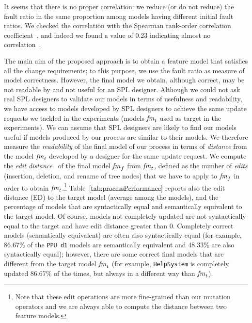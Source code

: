 \begin{tikzborder}{\cite{Gargantini16:validation}}
\begin{tikzborder}{\cite{gargantini_combinatorial_2017}}
\begin{tikzborder}{\cite{gargantini_combinatorial_2017}}
\begin{tikzborder}{\cite{garn2019}}
\begin{tikzborder}{\cite{arcaini2019achieving}}
	\bb It seems that there is no proper correlation: we reduce (or do not reduce) the fault ratio in the same proportion among models having different initial fault ratios. We checked the correlation with the Spearman rank-order correlation coefficient~\cite{Wohlin2012}, and indeed we found a value of 0.23 indicating almost no correlation~\cite{hinkle2003applied}.
	
	
	The main aim of the proposed approach is to obtain a feature model that satisfies all the change requirements; to this purpose, we use the fault ratio as measure of model correctness. However, the final model we obtain, although correct, may be not readable by and not useful for an SPL designer. Although we could not ask real SPL designers to validate our models in terms of usefulness and readability, we have access to models developed by SPL designers to achieve the same update requests we tackled in the experiments (models $\mathit{fm}_t$ used as target in the experiments). We can assume that SPL designers are likely to find our models useful if models produced by our process are similar to their models. We therefore measure the {\it readability} of the final model of our process in terms of {\it distance} from the model $\mathit{fm}_t$ developed by a designer for the same update request. We compute the {\it edit distance}~\cite{pawlik_efficient_2015,pawlik_tree_2016} of the final model $\mathit{fm}_f$ from $\mathit{fm}_t$, defined as the number of {\it edits} (insertion, deletion, and rename of tree nodes) that we have to apply to $\mathit{fm}_f$ in order to obtain $\mathit{fm}_t$.\footnote{Note that these edit operations are more fine-grained than our mutation operators and we are always able to compute the distance between two feature models.} Table~\ref{tab:processPerformance} reports also the edit distance (ED) to the target model (average among the models), and the percentage of models that are syntactically equal and semantically equivalent to the target model. Of course, models not completely updated are not syntactically equal to the target and have edit distance greater than 0. Completely correct models (semantically equivalent) are often also syntactically equal (for example, 86.67\% of the {\tt PPU d1} models are semantically equivalent and 48.33\% are also syntactically equal); however, there are some correct final models that are different from the target model $\mathit{fm}_t$ (for example, {\tt HelpSystem} is completely updated 86.67\% of the times, but always in a different way than $\mathit{fm}_t$).
	

\end{tikzborder}
\end{tikzborder}
\end{tikzborder}
\end{tikzborder}
\end{tikzborder}
